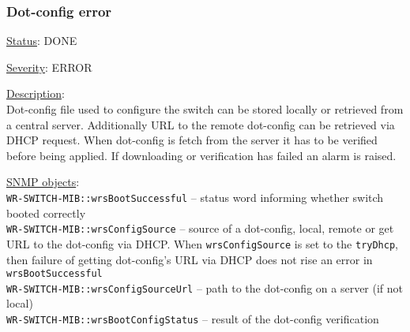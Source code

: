 \subsubsection{\bf Dot-config error}
		\label{fail:other:dot-config}
		\begin{packed_enum}
			\item [] \underline{Status}: DONE
			\item [] \underline{Severity}: ERROR
			\item [] \underline{Description}:\\
				Dot-config file used to configure the switch can be stored locally or
				retrieved from a central server. Additionally URL to the remote dot-config
				can be retrieved via DHCP request. When dot-config is fetch from the server
				it has to be verified before being applied. If downloading or verification has
				failed an alarm is raised.
			\item [] \underline{SNMP objects}:\\
				\texttt{WR-SWITCH-MIB::wrsBootSuccessful} -- status word informing
					whether switch booted correctly\\
				\texttt{WR-SWITCH-MIB::wrsConfigSource} -- source of a dot-config,
					local, remote or get URL to the dot-config via DHCP. When
					\texttt{wrsConfigSource} is set to the \texttt{tryDhcp}, then failure of
					getting dot-config's URL via DHCP does not rise an error in
					\texttt{wrsBootSuccessful}\\
				\texttt{WR-SWITCH-MIB::wrsConfigSourceUrl} -- path to the dot-config
					on a server (if not local)\\
				\texttt{WR-SWITCH-MIB::wrsBootConfigStatus} -- result of the dot-config verification
		\end{packed_enum}

